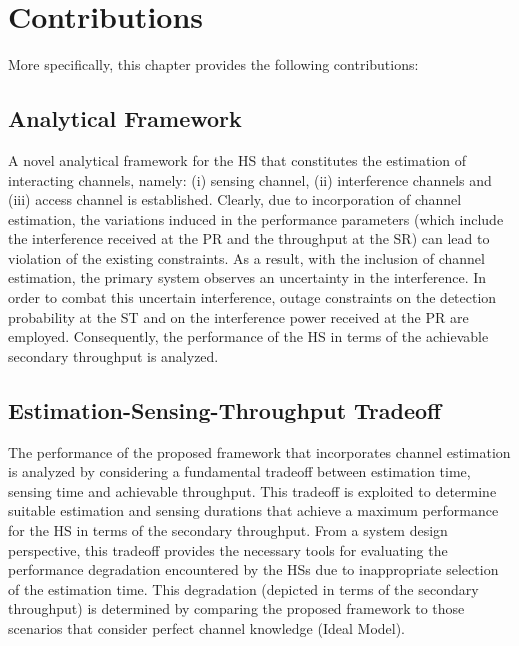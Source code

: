 \section{Contributions}
More specifically, this chapter provides the following contributions:

\subsection{Analytical Framework}
A novel analytical framework for the HS that constitutes the estimation of interacting channels, namely: (i) sensing channel, (ii) interference channels and (iii) access channel is established. Clearly, due to incorporation of channel estimation, the variations induced in the performance parameters (which include the interference received at the PR and the throughput at the SR) can lead to violation of the existing constraints. As a result, with the inclusion of channel estimation, the primary system observes an uncertainty in the interference. 
In order to combat this uncertain interference, outage constraints on the detection probability at the ST and on the interference power received at the PR are employed. Consequently, the performance of the HS in terms of the achievable secondary throughput is analyzed.
\subsection{Estimation-Sensing-Throughput Tradeoff}
The performance of the proposed framework that incorporates channel estimation is analyzed by considering a fundamental tradeoff between estimation time, sensing time and achievable throughput. This tradeoff is exploited to determine suitable estimation and sensing durations that achieve a maximum performance for the HS in terms of the secondary throughput. From a system design perspective, this tradeoff provides the necessary tools for evaluating the performance degradation encountered by the HSs due to inappropriate selection of the estimation time. This degradation (depicted in terms of the secondary throughput) is determined by comparing the proposed framework to those scenarios that consider perfect channel knowledge (Ideal Model).  

